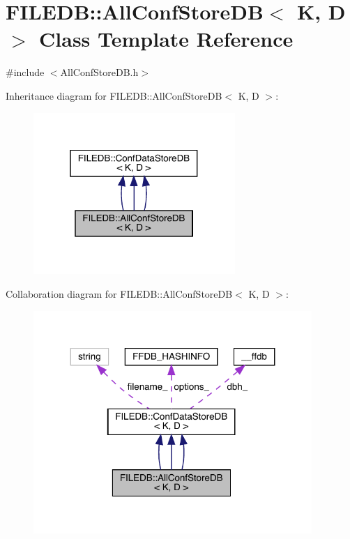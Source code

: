\hypertarget{classFILEDB_1_1AllConfStoreDB}{}\section{F\+I\+L\+E\+DB\+:\+:All\+Conf\+Store\+DB$<$ K, D $>$ Class Template Reference}
\label{classFILEDB_1_1AllConfStoreDB}


{\ttfamily \#include $<$All\+Conf\+Store\+D\+B.\+h$>$}



Inheritance diagram for F\+I\+L\+E\+DB\+:\+:All\+Conf\+Store\+DB$<$ K, D $>$\+:
\nopagebreak
\begin{figure}[H]
\begin{center}
\leavevmode
\includegraphics[width=217pt]{d6/d56/classFILEDB_1_1AllConfStoreDB__inherit__graph}
\end{center}
\end{figure}


Collaboration diagram for F\+I\+L\+E\+DB\+:\+:All\+Conf\+Store\+DB$<$ K, D $>$\+:
\nopagebreak
\begin{figure}[H]
\begin{center}
\leavevmode
\includegraphics[width=299pt]{d4/d50/classFILEDB_1_1AllConfStoreDB__coll__graph}
\end{center}
\end{figure}
